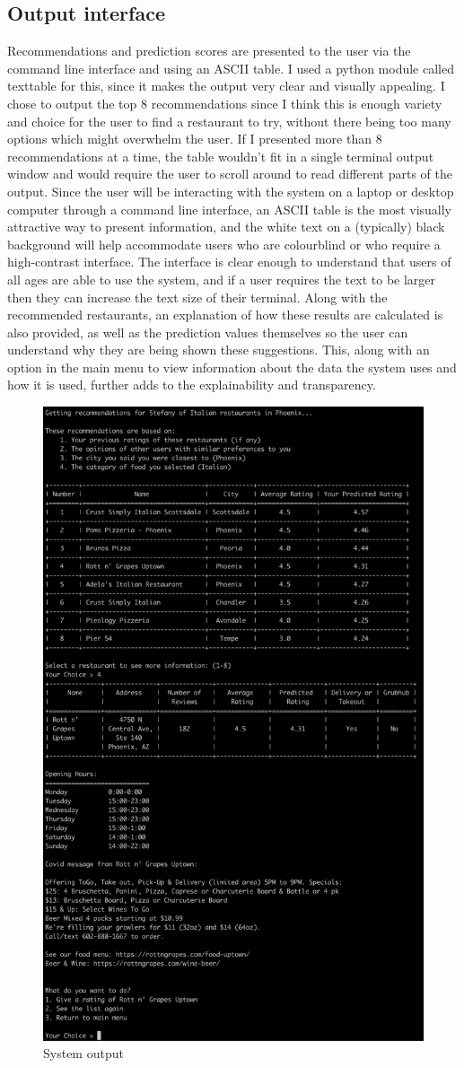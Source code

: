 \documentclass[conference]{IEEEtran}
\begin{document}
\subsection{Output interface}
Recommendations and prediction scores are presented to the user via the command line interface and using an ASCII table. 
I used a python module called texttable for this, since it makes the output very clear and visually appealing. 
I chose to output the top 8 recommendations since I think this is enough variety and choice for the user to find 
a restaurant to try, without there being too many options which might overwhelm the user. 
If I presented more than 8 recommendations at a time, the table wouldn't fit in a single terminal output window and 
would require the user to scroll around to read different parts of the output. 
Since the user will be interacting with the system on a laptop or desktop computer through a command line interface, 
an ASCII table is the most visually attractive way to present information, and the white text on a (typically) black 
background will help accommodate users who are colourblind or who require a high-contrast interface. 
The interface is clear enough to understand that users of all ages are able to use the system, and if a user 
requires the text to be larger then they can increase the text size of their terminal. 
Along with the recommended restaurants, an explanation of how these results are calculated is also provided, as 
well as the prediction values themselves so the user can understand why they are being shown these suggestions. 
This, along with an option in the main menu to view information about the data the system uses and how it is used, 
further adds to the explainability and transparency. 
\begin{figure}
    \centering
    \includegraphics[width=0.5\linewidth]{output.png}
    \caption{System output}
    \label{fig:output}
\end{figure}
\end{document}
